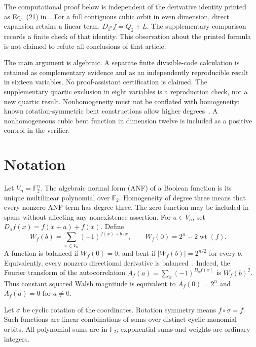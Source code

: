 \documentclass[11pt,a4paper]{article}
\newcommand{\F}{\mathbb F_2}
\newcommand{\wt}{\operatorname{wt}}
\begin{document}
The computational proof below is independent of the derivative identity printed as Eq.~(21) in~\cite{sun}. For a full contiguous cubic orbit in even dimension, direct expansion retains a linear term: $D_{1^n}f=Q_2+L$. The supplementary comparison records a finite check of that identity. This observation about the printed formula is not claimed to refute all conclusions of that article.

The main argument is algebraic. A separate finite divisible-code calculation is retained as complementary evidence and as an independently reproducible result in sixteen variables. No proof-assistant certification is claimed. The supplementary quartic exclusion in eight variables is a reproduction check, not a new quartic result. Nonhomogeneity must not be conflated with homogeneity: known rotation-symmetric bent constructions allow higher degrees~\cite{sutang}. A nonhomogeneous cubic bent function in dimension twelve is included as a positive control in the verifier.

\section{Notation}
Let $V_n=\F^n$. The algebraic normal form (ANF) of a Boolean function is its unique multilinear polynomial over $\F$. Homogeneity of degree three means that every nonzero ANF term has degree three. The zero function may be included in spans without affecting any nonexistence assertion.
For $a\in V_n$, set $D_a f(x)=f(x+a)+f(x)$. Define
\[
 W_f(b)=\sum_{x\in V_n}(-1)^{f(x)+b\cdot x},\qquad
 W_f(0)=2^n-2\wt(f).
\]
A function is balanced if $W_f(0)=0$, and bent if $|W_f(b)|=2^{n/2}$ for every $b$. Equivalently, every nonzero directional derivative is balanced~\cite{rothaus}. Indeed, the Fourier transform of the autocorrelation $A_f(a)=\sum_x(-1)^{D_af(x)}$ is $W_f(b)^2$. Thus constant squared Walsh magnitude is equivalent to $A_f(0)=2^n$ and $A_f(a)=0$ for $a\ne0$.

Let $\sigma$ be cyclic rotation of the coordinates. Rotation symmetry means $f\circ\sigma=f$. Such functions are linear combinations of sums over distinct cyclic monomial orbits. All polynomial sums are in $\F$; exponential sums and weights are ordinary integers.
\end{document}
